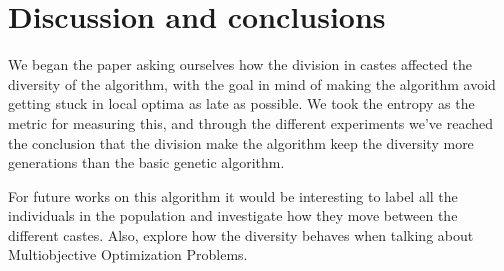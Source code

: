 \section{Discussion and conclusions}
\label{sec:conc}

We began the paper asking ourselves how the division in castes affected
the diversity of the algorithm, with the goal in mind of making the algorithm avoid getting stuck
in local optima as late as possible. We took the entropy as the metric for measuring this, and
through the different experiments we've reached the conclusion that the division make
the algorithm keep the diversity more generations than the basic genetic algorithm. 

For future works on this algorithm it would be interesting to label all the individuals in
the population and investigate how they move between the different castes. Also, explore
how the diversity behaves when talking about Multiobjective Optimization Problems.